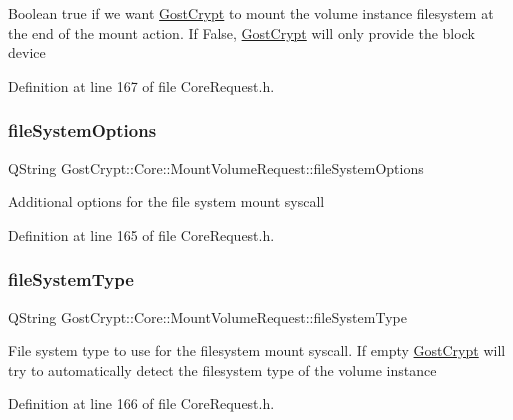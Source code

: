 Boolean true if we want \hyperlink{namespace_gost_crypt}{Gost\+Crypt} to mount the volume instance filesystem at the end of the mount action. If False, \hyperlink{namespace_gost_crypt}{Gost\+Crypt} will only provide the block device 

Definition at line 167 of file Core\+Request.\+h.

\mbox{\label{struct_gost_crypt_1_1_core_1_1_mount_volume_request_aae99596107c8aec7b44f91f0f7bf4525}} 
\subsubsection{\texorpdfstring{file\+System\+Options}{fileSystemOptions}}
{\footnotesize\ttfamily Q\+String Gost\+Crypt\+::\+Core\+::\+Mount\+Volume\+Request\+::file\+System\+Options}

Additional options for the file system mount syscall 

Definition at line 165 of file Core\+Request.\+h.

\mbox{\label{struct_gost_crypt_1_1_core_1_1_mount_volume_request_ab35801e361af1509638f47ec6117d5ac}} 
\subsubsection{\texorpdfstring{file\+System\+Type}{fileSystemType}}
{\footnotesize\ttfamily Q\+String Gost\+Crypt\+::\+Core\+::\+Mount\+Volume\+Request\+::file\+System\+Type}

File system type to use for the filesystem mount syscall. If empty \hyperlink{namespace_gost_crypt}{Gost\+Crypt} will try to automatically detect the filesystem type of the volume instance 

Definition at line 166 of file Core\+Request.\+h.

